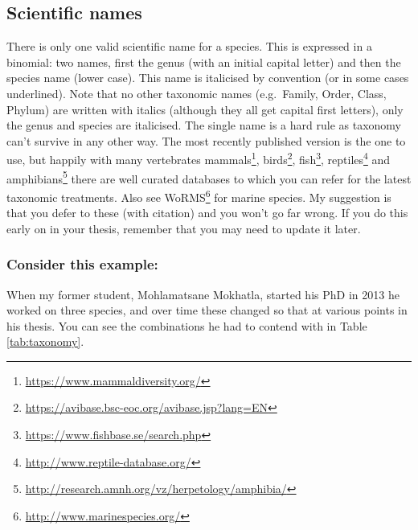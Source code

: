 \documentclass[
]{krantz}
\renewcommand{\href}[2]{#2\footnote{\url{#1}}}
\begin{document}
\hypertarget{scientific-names}{%
\subsection{Scientific names}\label{scientific-names}}

There is only one valid scientific name for a species. This is expressed in a binomial: two names, first the genus (with an initial capital letter) and then the species name (lower case). This name is italicised by convention (or in some cases underlined). Note that no other taxonomic names (e.g.~Family, Order, Class, Phylum) are written with italics (although they all get capital first letters), only the genus and species are italicised. The single name is a hard rule as taxonomy can't survive in any other way. The most recently published version is the one to use, but happily with many vertebrates \href{https://www.mammaldiversity.org/}{mammals}, \href{https://avibase.bsc-eoc.org/avibase.jsp?lang=EN}{birds}, \href{https://www.fishbase.se/search.php}{fish}, \href{http://www.reptile-database.org/}{reptiles} and \href{http://research.amnh.org/vz/herpetology/amphibia/}{amphibians} there are well curated databases to which you can refer for the latest taxonomic treatments. Also see \href{http://www.marinespecies.org/}{WoRMS} for marine species. My suggestion is that you defer to these (with citation) and you won't go far wrong. If you do this early on in your thesis, remember that you may need to update it later.

\hypertarget{consider-this-example}{%
\subsubsection{Consider this example:}\label{consider-this-example}}

When my former student, Mohlamatsane Mokhatla, started his PhD in 2013 he worked on three species, and over time these changed so that at various points in his thesis. You can see the combinations he had to contend with in Table \ref{tab:taxonomy}.
\end{document}
